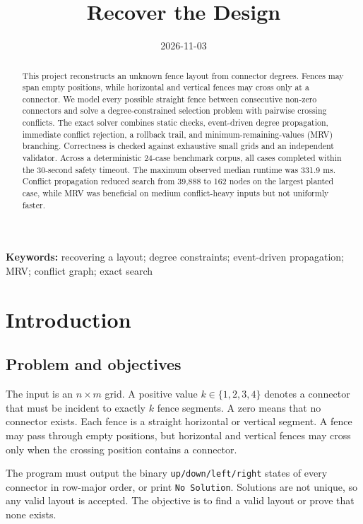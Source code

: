 \documentclass[11pt,a4paper]{article}
\title{\vspace{-1.3cm}Recover the Design}
\author{}
\date{2026-11-03}
\begin{document}
\maketitle

\begin{abstract}
This project reconstructs an unknown fence layout from connector degrees.
Fences may span empty positions, while horizontal and vertical fences may
cross only at a connector. We model every possible straight fence between
consecutive non-zero connectors and solve a degree-constrained selection
problem with pairwise crossing conflicts. The exact solver combines static
checks, event-driven degree propagation, immediate conflict rejection, a
rollback trail, and minimum-remaining-values (MRV) branching. Correctness is
checked against exhaustive small grids and an independent validator.
Across a deterministic 24-case benchmark corpus, all cases completed within
the 30-second safety timeout. The maximum observed median runtime was
331.9 ms. Conflict propagation reduced search from 39,888 to 162 nodes on the
largest planted case, while MRV was beneficial on medium conflict-heavy inputs
but not uniformly faster.
\end{abstract}

\noindent\textbf{Keywords:} recovering a layout; degree constraints; event-driven
propagation; MRV; conflict graph; exact search

\clearpage
\tableofcontents
\clearpage

\section{Introduction}

\subsection{Problem and objectives}

The input is an $n\times m$ grid. A positive value $k\in\{1,2,3,4\}$ denotes a
connector that must be incident to exactly $k$ fence segments. A zero means
that no connector exists. Each fence is a straight horizontal or vertical
segment. A fence may pass through empty positions, but horizontal and vertical
fences may cross only when the crossing position contains a connector.

The program must output the binary \texttt{up/down/left/right} states of every
connector in row-major order, or print \texttt{No Solution}. Solutions are not
unique, so any valid layout is accepted. The objective is to find a valid layout
or prove that none exists.
\end{document}
